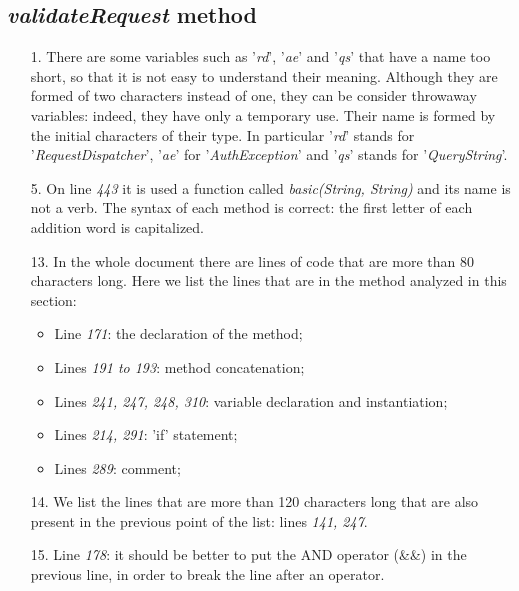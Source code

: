 \subsection{\textit{validateRequest} method}

\begin{itemize}
        \item[1.] 
           There are some variables such as '\textit{rd}',  '\textit{ae}' and '\textit{qs}' that have a name too short, so that it is not easy to understand their meaning. Although they are formed of two characters instead of one, they can be consider throwaway variables: indeed, they have only a temporary use. Their name is formed by the initial characters of their type. In particular '\textit{rd}' stands for '\textit{RequestDispatcher}', '\textit{ae}' for '\textit{AuthException}' and '\textit{qs}' stands for '\textit{QueryString}'.
        \item[5.] 
            On line \textit{443} it is used a function called \textit{basic(String, String)} and its name is not a verb. The syntax of each method is correct: the first letter of each addition word is capitalized.
        \item[13.] 
            In the whole document there are lines of code that are more than 80 characters long. 
            \newline
            Here we list the lines that are in the method analyzed in this section:
                \begin{itemize}
                    \item Line \textit{171}: the declaration of the method;
                    \item Lines \textit{191 to 193}: method concatenation;
                    \item Lines \textit{241, 247, 248, 310}: variable declaration and instantiation;
                    \item Lines \textit{214, 291}: 'if' statement;
                    \item Lines \textit{289}: comment;
                \end{itemize}
        \item[14.] 
            We list the lines that are more than 120 characters long that are also present in the previous point of the list: lines \textit{141, 247}.
        \item[15.] 
            Line \textit{178}: it should be better to put the AND operator (\&\&) in the previous line, in order to break the line after an operator.

\end{itemize}
